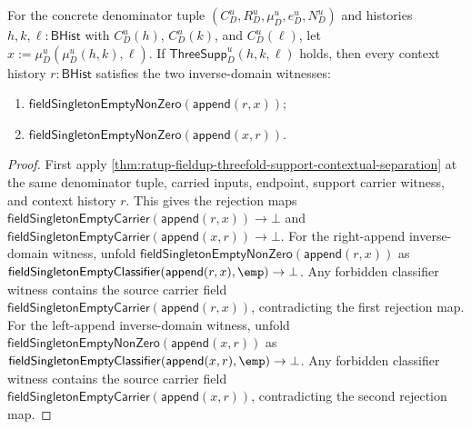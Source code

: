 \begin{theorem}
\label{thm:ratup-fieldup-threefold-support-contextual-nonzero-package}
For the concrete denominator tuple $(C_D^u,R_D^u,\mu_D^u,e_D^u,N_D^u)$ and
histories $h,k,\ell:\mathsf{BHist}$ with $C_D^u(h)$, $C_D^u(k)$, and
$C_D^u(\ell)$, let $x:=\mu_D^u(\mu_D^u(h,k),\ell)$. If
$\mathsf{ThreeSupp}_D^u(h,k,\ell)$ holds, then every context history
$r:\mathsf{BHist}$ satisfies the two inverse-domain witnesses:
\begin{enumerate}
  \item $\mathsf{fieldSingletonEmptyNonZero}(\mathsf{append}(r,x))$;
  \item $\mathsf{fieldSingletonEmptyNonZero}(\mathsf{append}(x,r))$.
\end{enumerate}
\end{theorem}
\begin{proof}
First apply
\autoref{thm:ratup-fieldup-threefold-support-contextual-separation} at the same
denominator tuple, carried inputs, endpoint, support carrier witness, and context
history $r$. This gives the rejection maps
$\mathsf{fieldSingletonEmptyCarrier}(\mathsf{append}(r,x))\to\bot$ and
$\mathsf{fieldSingletonEmptyCarrier}(\mathsf{append}(x,r))\to\bot$.
For the right-append inverse-domain witness, unfold
$\mathsf{fieldSingletonEmptyNonZero}(\mathsf{append}(r,x))$ as
$\mathsf{fieldSingletonEmptyClassifier}(\mathsf{append}(r,x),\emp)\to\bot$.
Any forbidden classifier witness contains the source carrier field
$\mathsf{fieldSingletonEmptyCarrier}(\mathsf{append}(r,x))$, contradicting the
first rejection map.
For the left-append inverse-domain witness, unfold
$\mathsf{fieldSingletonEmptyNonZero}(\mathsf{append}(x,r))$ as
$\mathsf{fieldSingletonEmptyClassifier}(\mathsf{append}(x,r),\emp)\to\bot$.
Any forbidden classifier witness contains the source carrier field
$\mathsf{fieldSingletonEmptyCarrier}(\mathsf{append}(x,r))$, contradicting the
second rejection map.
\end{proof}

